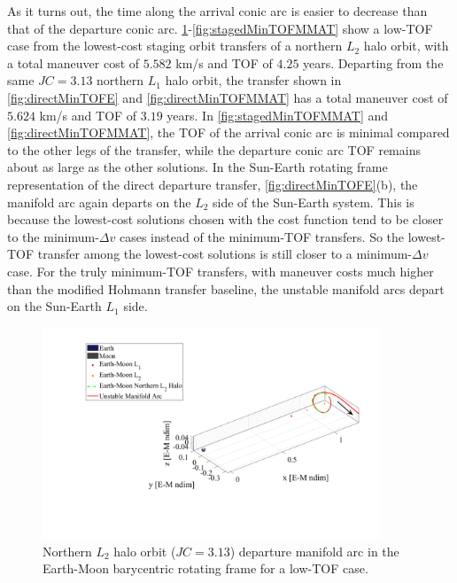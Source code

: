 As it turns out, the time along the arrival conic arc is easier to decrease than that of the
departure conic arc. \cref{fig:stagedMinTOFEM}-\cref{fig:stagedMinTOFMMAT} show a low-TOF case from
the lowest-cost staging orbit transfers of a northern $L_{2}$ halo orbit, with a total maneuver
cost of $5.582$ km/s and TOF of $4.25$ years. Departing from the same $JC=3.13$ northern $L_{1}$
halo orbit, the transfer shown in \cref{fig:directMinTOFE} and \cref{fig:directMinTOFMMAT} has a
total maneuver cost of $5.624$ km/s and TOF of $3.19$ years. In \cref{fig:stagedMinTOFMMAT} and
\cref{fig:directMinTOFMMAT}, the TOF of the arrival conic arc is minimal compared to the other legs
of the transfer, while the departure conic arc TOF remains about as large as the other solutions.
In the Sun-Earth rotating frame representation of the direct departure transfer,
\cref{fig:directMinTOFE}(b), the manifold arc again departs on the $L_{2}$ side of the Sun-Earth
system. This is because the lowest-cost solutions chosen with the cost function tend to be closer
to the minimum-$\Delta v$ cases instead of the minimum-TOF transfers. So the lowest-TOF transfer
among the lowest-cost solutions is still closer to a minimum-$\Delta v$ case. For the truly
minimum-TOF transfers, with maneuver costs much higher than the modified Hohmann transfer baseline,
the unstable manifold arcs depart on the Sun-Earth $L_{1}$ side.

\begin{figure}[!htb]
    \centering
    \includegraphics[width=0.9\textwidth]{figures/StagedMinTOFEM.pdf}
    \caption{Northern $L_{2}$ halo orbit ($JC=3.13$) departure manifold arc in the Earth-Moon barycentric rotating frame for a low-TOF case.}
    \label{fig:stagedMinTOFEM}
\end{figure}

